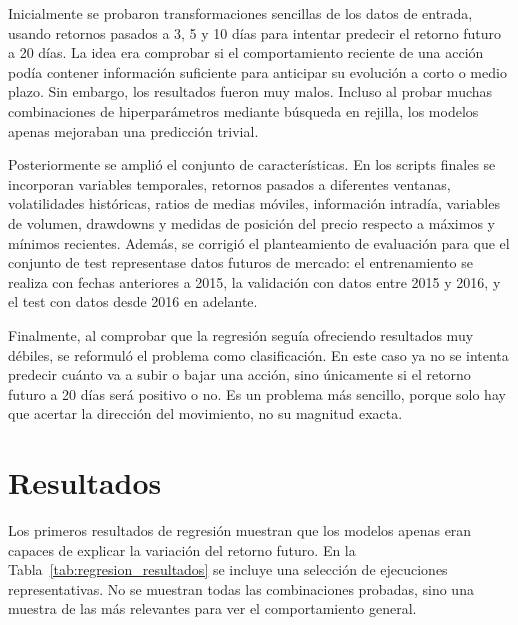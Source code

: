 \documentclass[runningheads]{llncs}
\begin{document}
Inicialmente se probaron transformaciones sencillas de los datos de entrada, usando retornos pasados a 3, 5 y 10 días para intentar predecir el retorno futuro a 20 días. La idea era comprobar si el comportamiento reciente de una acción podía contener información suficiente para anticipar su evolución a corto o medio plazo. Sin embargo, los resultados fueron muy malos. Incluso al probar muchas combinaciones de hiperparámetros mediante búsqueda en rejilla, los modelos apenas mejoraban una predicción trivial.

Posteriormente se amplió el conjunto de características. En los scripts finales se incorporan variables temporales, retornos pasados a diferentes ventanas, volatilidades históricas, ratios de medias móviles, información intradía, variables de volumen, drawdowns y medidas de posición del precio respecto a máximos y mínimos recientes. Además, se corrigió el planteamiento de evaluación para que el conjunto de test representase datos futuros de mercado: el entrenamiento se realiza con fechas anteriores a 2015, la validación con datos entre 2015 y 2016, y el test con datos desde 2016 en adelante.

Finalmente, al comprobar que la regresión seguía ofreciendo resultados muy débiles, se reformuló el problema como clasificación. En este caso ya no se intenta predecir cuánto va a subir o bajar una acción, sino únicamente si el retorno futuro a 20 días será positivo o no. Es un problema más sencillo, porque solo hay que acertar la dirección del movimiento, no su magnitud exacta.

\section{Resultados}

Los primeros resultados de regresión muestran que los modelos apenas eran capaces de explicar la variación del retorno futuro. En la Tabla~\ref{tab:regresion_resultados} se incluye una selección de ejecuciones representativas. No se muestran todas las combinaciones probadas, sino una muestra de las más relevantes para ver el comportamiento general.
\end{document}
